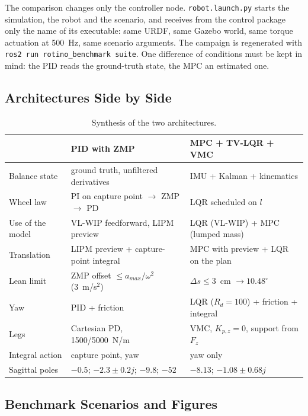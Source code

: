 \documentclass[11pt,a4paper]{article}
\newcommand{\dgr}{^{\circ}}
\begin{document}
The comparison changes only the controller node.  \texttt{robot.launch.py} starts the
simulation, the robot and the scenario, and receives from the control package only the name of
its executable: same URDF, same Gazebo world, same torque actuation at 500~Hz, same scenario
arguments.  The campaign is regenerated with \texttt{ros2 run rotino\_benchmark suite}.  One
difference of conditions must be kept in mind: the PID reads the ground-truth state, the MPC an
estimated one.

\subsection{Architectures Side by Side}

\begin{table}[H]
    \centering
    \caption{Synthesis of the two architectures.}
    \label{tab:synth}
    \begin{tabular}{p{3.0cm}p{5.4cm}p{5.4cm}}
        \toprule
        & PID with ZMP & MPC + TV-LQR + VMC \\
        \midrule
        Balance state & ground truth, unfiltered derivatives & IMU + Kalman + kinematics \\
        Wheel law & PI on capture point $\to$ ZMP $\to$ PD & LQR scheduled on $l$ \\
        Use of the model & VL-WIP feedforward, LIPM preview & LQR (VL-WIP) + MPC (lumped mass) \\
        Translation & LIPM preview + capture-point integral & MPC with preview + LQR on the plan \\
        Lean limit & ZMP offset $\le a_{max}/\omega^2$ (3~m/s$^2$) & $\Delta s \le 3$~cm $\to 10.48\dgr$ \\
        Yaw & PID + friction & LQR ($R_d = 100$) + friction + integral \\
        Legs & Cartesian PD, 1500/5000~N/m & VMC, $K_{p,z} = 0$, support from $F_z$ \\
        Integral action & capture point, yaw & yaw only \\
        Sagittal poles & $-0.5$; $-2.3\pm0.2j$; $-9.8$; $-52$ & $-8.13$; $-1.08\pm0.68j$ \\
        \bottomrule
    \end{tabular}
\end{table}

\subsection{Benchmark Scenarios and Figures}
\end{document}
